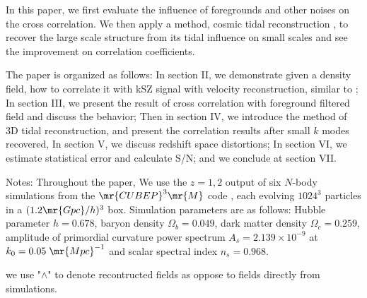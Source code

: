 In this paper, 
we first evaluate the influence of foregrounds and other noises 
on the cross correlation. 
We then apply a method, cosmic tidal reconstruction \cite{2012:pen,2015:zhu}, 
to recover the large scale structure from its tidal influence on small scales 
and see the improvement on correlation coefficients. 

The paper is organized as follows: 
In section II, we demonstrate given a density field, how to correlate it with kSZ signal with velocity reconstruction, similar to \cite{Shao11}; 
In section III, we present the result of cross correlation with foreground filtered field 
and discuss the behavior; 
Then in section IV, we introduce the method of 3D tidal reconstruction, 
and present the correlation results after small $k$ modes recovered, 
In section V, we discuss redshift space distortions; 
In section VI, we estimate statistical error and calculate S/N; 
and we conclude at section VII.


Notes: 
Throughout the paper, We use the $z=1,2$ output of six $N$-body simulations from the
$\mr{CUBEP}^3\mr{M}$ code \cite{2013:code}, each evolving $1024^3$ particles in a $(1.2\mr{Gpc}/h)^3$ box. 
Simulation parameters are as follows: Hubble parameter $h=0.678$, baryon
density $\Omega_{b}=0.049$, dark matter density $\Omega_{c}=0.259$,
amplitude of primordial curvature power spectrum $A_s=2.139\times10^{-9}$ at 
$k_0=0.05\;\mr{Mpc}^{-1}$ and scalar spectral index $n_s=0.968$.

we use "$\wedge$" to denote recontructed fields as 
oppose to fields directly from simulations.
